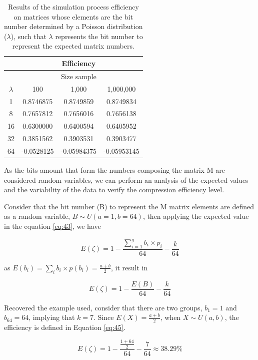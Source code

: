 \documentclass[10pt]{article}
\begin{document}
\begin{table}[h]
  \centering
  \caption{Results of the simulation process efficiency on matrices whose elements are the bit number determined by a Poisson distribution ($\lambda$), such that $\lambda$ represents the bit number to represent the expected matrix numbers.}
 \begin{tabular}{cccc}
    \hline
			& 	&Efficiency         & \\
    \hline
			&  	&Size sample& \\
    $\lambda$		& 100	& 1,000		    & 1,000,000 \\
    \hline
     1	& 0.8746875 & 0.8749859   & 0.8749834 \\
     8 	& 0.7657812 & 0.7656016   & 0.7656138 \\
     16	& 0.6300000 & 0.6400594   & 0.6405952 \\
     32	& 0.3851562 & 0.3903531   & 0.3903477 \\
     64	& -0.0528125& -0.05984375 & -0.05953145 \\
    \hline
 \end{tabular}
 \label{tab:05}
\end{table}

As the bits amount that form the numbers composing the matrix M are considered random variables, we can perform an analysis of the expected values ​​and the variability of the data to verify the compression efficiency level.

Consider that the bit number (B) to represent the M matrix elements are defined as a random variable, $B \sim U(a=1,b=64)$, then applying the expected value in the equation \ref{eq:43}, we have

\begin{equation}\label{eq:43}
 E(\zeta) = 1 - \frac{\sum_{i=1}^{g}  b_i \times p_i }{64} - \frac{k}{64} 
\end{equation}

\noindent as $E(b_i) = \sum_{i} b_i \times p(b_i) = \frac{a+b}{2}$, it result in 

\begin{equation}\label{eq:44}
 E(\zeta) = 1 - \frac{E(B)}{64} - \frac{k}{64} 
\end{equation}

Recovered the example used, consider that there are two groups, $b_1=1$ and $b_{64}=64$, implying that $k=7$. Since $E(X)=\frac{a + b}{2}$, when $X \sim U(a,b)$, the efficiency is defined in Equation \ref{eq:45}.

\begin{equation}\label{eq:45}
 E(\zeta) = 1 - \frac{\frac{1+64}{2}}{64} - \frac{7}{64} \approx 38.29\% 
\end{equation}
\end{document}
